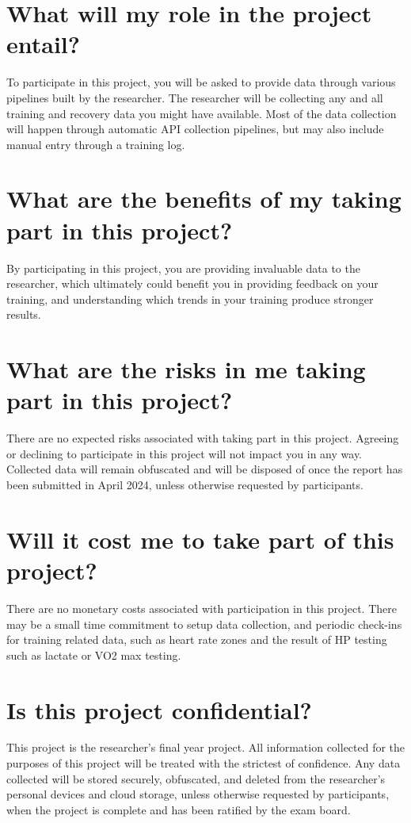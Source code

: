 \documentclass[a4paper,12pt]{article}
\newcommand{\deadline}{April 2024}
\begin{document}
\section*{What will my role in the project entail?}
To participate in this project, you will be asked to provide data through various pipelines built by the researcher. The researcher will be collecting any and all training and recovery data you might have available. Most of the data collection will happen through automatic API collection pipelines, but may also include manual entry through a training log.
\section*{What are the benefits of my taking part in this project?}
By participating in this project, you are providing invaluable data to the researcher, which ultimately could benefit you in providing feedback on your training, and understanding which trends in your training produce stronger results.
\section*{What are the risks in me taking part in this project?}
There are no expected risks associated with taking part in this project. Agreeing or declining to participate in this project will not impact you in any way. Collected data will remain obfuscated and will be disposed of once the report has been submitted in \deadline, unless otherwise requested by participants.
\section*{Will it cost me to take part of this project?}
There are no monetary costs associated with participation in this project. There may be a small time commitment to setup data collection, and periodic check-ins for training related data, such as heart rate zones and the result of HP testing such as lactate or VO2 max testing.
\section*{Is this project confidential?}
This project is the researcher's final year project. All information collected for the purposes of this project will be treated with the strictest of confidence. Any data collected will be stored securely, obfuscated, and deleted from the researcher's personal devices and cloud storage, unless otherwise requested by participants, when the project is complete and has been ratified by the exam board.
\end{document}
